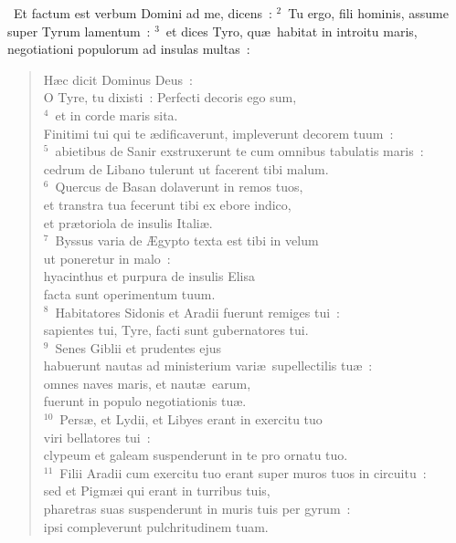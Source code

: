 ~Et factum est verbum Domini ad me, dicens~:
${}^{2}$~Tu ergo, fili hominis, assume super Tyrum lamentum~:
${}^{3}$~et dices Tyro, qu\ae\ habitat in introitu maris, negotiationi populorum ad insulas multas~: \begin{flushleft}\begin{verse}H\ae c dicit Dominus Deus~:\\ O Tyre, tu dixisti~: Perfecti decoris ego sum,\\
${}^{4}$~et in corde maris sita.\\ Finitimi tui qui te \ae dificaverunt, impleverunt decorem tuum~:\\
${}^{5}$~abietibus de Sanir exstruxerunt te cum omnibus tabulatis maris~:\\ cedrum de Libano tulerunt ut facerent tibi malum.\\
${}^{6}$~Quercus de Basan dolaverunt in remos tuos,\\ et transtra tua fecerunt tibi ex ebore indico,\\ et pr\ae toriola de insulis Itali\ae .\\
${}^{7}$~Byssus varia de \AE gypto texta est tibi in velum\\ ut poneretur in malo~:\\ hyacinthus et purpura de insulis Elisa\\ facta sunt operimentum tuum.\\
${}^{8}$~Habitatores Sidonis et Aradii fuerunt remiges tui~:\\ sapientes tui, Tyre, facti sunt gubernatores tui.\\
${}^{9}$~Senes Giblii et prudentes ejus\\ habuerunt nautas ad ministerium vari\ae\ supellectilis tu\ae~:\\ omnes naves maris, et naut\ae\ earum,\\ fuerunt in populo negotiationis tu\ae .\\
${}^{10}$~Pers\ae , et Lydii, et Libyes erant in exercitu tuo\\ viri bellatores tui~:\\ clypeum et galeam suspenderunt in te pro ornatu tuo.\\
${}^{11}$~Filii Aradii cum exercitu tuo erant super muros tuos in circuitu~:\\ sed et Pigm\ae i qui erant in turribus tuis,\\ pharetras suas suspenderunt in muris tuis per gyrum~:\\ ipsi compleverunt pulchritudinem tuam.\\

\end{verse}
\end{flushleft}
